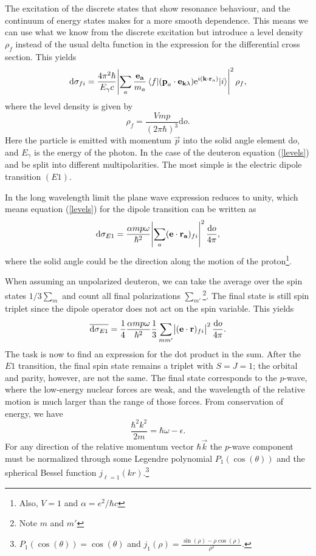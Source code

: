 The excitation of the discrete states that show resonance behaviour, and the continuum of energy states makes for a more smooth dependence. This means we can use what we know from the discrete excitation but introduce a level density $\rho_f$ instead of the usual delta function in the expression for the differential cross section. This yields
\begin{equation}\label{levels}
	\textrm{d}\sigma_{fi} = \frac{4\pi^2\hbar}{E_\gamma c}\abs{\sum_a \frac{\bm{\mathrm{e_a}}}{m_a}\mel{f}{(\bm{\mathrm{p}}_a\cdot \bm{\mathrm{e}}_{\bm{\mathrm{k}}\lambda})\textrm{e}^{i(\bm{\mathrm{k}}\cdot \bm{\mathrm{r}}_a)}}{i}}^2 \rho_f,
\end{equation}
where the level density is given by
\begin{equation}
	\rho_f = \frac{Vmp}{(2\pi\hbar)^3} \textrm{d}o.
\end{equation}
Here the particle is emitted with momentum $\vec{p}$ into the solid angle element $\textrm{d}o$, and $E_\gamma$ is the energy of the photon. In the case of the deuteron equation (\ref{levels}) and be split into different multipolarities. The most simple is the electric dipole transition $(E1)$.

In the long wavelength limit the plane wave expression reduces to unity, which means equation (\ref{levels}) for the dipole transition can be written as
\begin{equation} \label{diffE1}
	\textrm{d}\sigma_{E1} = \frac{\alpha mp\omega}{\hbar^2} \abs{\sum_a (\bm{\mathrm{e}}\cdot \bm{\mathrm{r_a}})_{fi}}^2 \frac{\textrm{d}o}{4\pi},
\end{equation}
where the solid angle could be the direction along the motion of the proton\footnote{Also, $V=1$ and $\alpha=e^2/\hbar c$}.

When assuming an unpolarized deuteron, we can take the average over the spin states $1/3 \sum_m$ and count all final polarizations $\sum_{m'}$\footnote{Note $m$ and $m'$}. The final state is still spin triplet since the dipole operator does not act on the spin variable. This yields
\begin{equation} \label{diffcross}
	\overline{\textrm{d}\sigma_{E1}} = \frac{1}{4}\frac{\alpha m p \omega}{\hbar^2} \frac{1}{3} \sum_{mm'}\abs{(\bm{\mathrm{e}}\cdot \bm{\mathrm{r}})_{fi}}^2 \frac{\textrm{d}o}{4\pi}.
\end{equation}
The task is now to find an expression for the dot product in the sum. After the $E1$ transition, the final spin state remains a triplet with $S=J=1$; the orbital and parity, however, are not the same. The final state corresponds to the $p$-wave, where the low-energy nuclear forces are weak, and the wavelength of the relative motion is much larger than the range of those forces. From conservation of energy, we have
\begin{equation} \label{kq}
	\frac{\hbar^2 k^2}{2m} = \hbar\omega - \epsilon.
\end{equation}
 For any direction of the relative momentum vector $\hbar \vec{k}$ the $p$-wave component must be normalized through some Legendre polynomial $P_1(\cos(\theta))$ and the spherical Bessel function $j_{\ell=1}(kr)$.\footnote{$P_1(\cos(\theta))=\cos(\theta)$ and $j_1(\rho)=\frac{\sin(\rho)-\rho\cos(\rho)}{\rho^2}.$}

